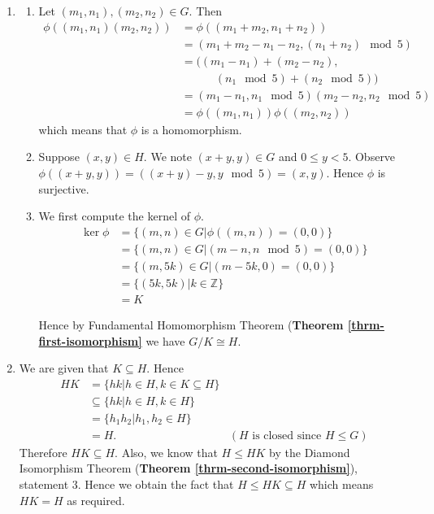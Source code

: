 \begin{enumerate}
    \item \begin{enumerate}[label=(\roman*)]
        \item Let $(m_1, n_1), (m_2, n_2) \in G$. Then
        \begin{align*}
            \phi((m_1, n_1)(m_2, n_2)) &= \phi((m_1 + m_2, n_1 + n_2))\\
            &= (m_1 + m_2 - n_1 - n_2, (n_1 + n_2) \mod 5)\\
            &= ((m_1 - n_1) + (m_2 - n_2),\\
            &\quad\quad\quad(n_1 \mod 5) + (n_2 \mod 5))\\
            &= (m_1 - n_1, n_1 \mod 5)(m_2 - n_2, n_2 \mod5)\\
            &= \phi((m_1, n_1))\phi((m_2, n_2))
        \end{align*}
        which means that $\phi$ is a homomorphism.
        
        \item Suppose $(x, y) \in H$. We note $(x+y, y) \in G$ and $0 \leq y < 5$. Observe $\phi((x+y, y)) = ((x+y) - y, y \mod 5) = (x, y)$. Hence $\phi$ is surjective.
        
        \item We first compute the kernel of $\phi$.
        \begin{align*}
            \ker\phi &= \{(m, n) \in G \vert \phi((m, n)) = (0, 0)\}\\
            &= \{(m, n) \in G \vert (m-n, n \mod 5) = (0, 0)\}\\
            &= \{(m, 5k) \in G \vert (m - 5k, 0) = (0, 0)\}\\
            &= \{(5k, 5k) \vert k \in \mathbb{Z}\}\\
            &= K
        \end{align*}
        
        Hence by Fundamental Homomorphism Theorem (\textbf{Theorem \ref{thrm-first-isomorphism}} we have $G / K \cong H$.
    \end{enumerate}
    
    \item We are given that $K \subseteq H$. Hence
    \begin{align*}
        HK &= \{hk \vert h \in H, k \in K \subseteq H\}\\
        &\subseteq \{hk \vert h \in H, k \in H\}\\
        &= \{h_1h_2 \vert h_1, h_2 \in H\}\\
        &= H. & (H \text{ is closed since } H \leq G)
    \end{align*}
    Therefore $HK \subseteq H$. Also, we know that $H \leq HK$ by the Diamond Isomorphism Theorem (\textbf{Theorem \ref{thrm-second-isomorphism}}), statement 3. Hence we obtain the fact that $H \leq HK \subseteq H$ which means $HK = H$ as required.
    

\end{enumerate}
